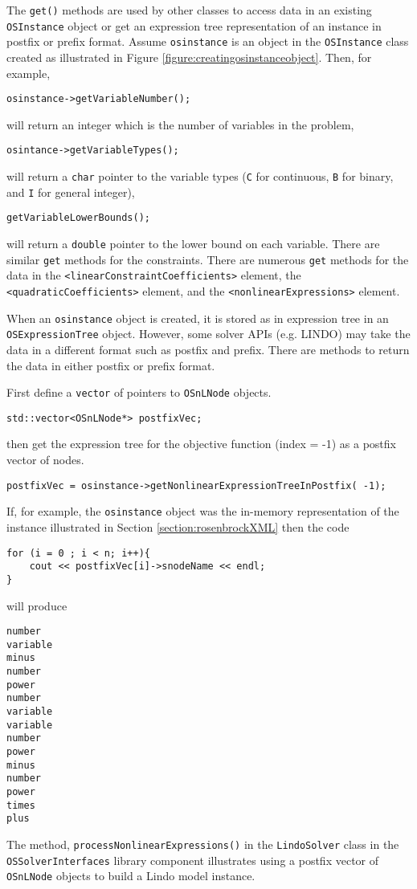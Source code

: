 \documentclass[11pt]{article}
\newcounter{Fig}
\renewcommand{\_}{{\char"5F}}
\renewcommand{\{}{{\char"7B}}
\renewcommand{\}}{{\char"7D}}
\renewcommand{\^}{{\char"0D}}
\renewcommand{\'}{{\char"0D}}
\begin{document}
The {\tt get()} methods are used by other classes to access data in an existing {\tt OSInstance} object or get an expression tree representation of an instance in postfix or prefix format.   Assume {\tt osinstance} is an object in the {\tt OSInstance} class created as illustrated in Figure \ref{figure:creatingosinstanceobject}. Then, for example,
\begin{verbatim}
osinstance->getVariableNumber();
\end{verbatim}
will return an integer which is the number of variables in the problem,
\begin{verbatim}
osintance->getVariableTypes();
\end{verbatim}
will return a {\tt char} pointer to the variable types ({\tt C} for continuous, {\tt B} for binary, and {\tt I} for general integer),
\begin{verbatim}
getVariableLowerBounds();
\end{verbatim}
will  return a {\tt double} pointer to the lower bound on each variable. There are similar {\tt get} methods for the constraints. There are numerous {\tt get} methods for the data in the {\tt <linearConstraintCoefficients>}  element, the {\tt <quadraticCoefficients>} element, and the {\tt <nonlinearExpressions>} element.

When an {\tt osinstance} object is created, it is stored as in expression tree in an {\tt OSExpressionTree} object. However, some solver APIs (e.g. LINDO) may take the data in a different format such as postfix and prefix. There are methods to return the data in either postfix or prefix format.

First define a {\tt vector} of pointers to {\tt OSnLNode} objects.
\begin{verbatim}
std::vector<OSnLNode*> postfixVec;
\end{verbatim}
then get the expression tree for the objective function (index = -1) as a postfix vector of nodes.
\begin{verbatim}
postfixVec = osinstance->getNonlinearExpressionTreeInPostfix( -1);
\end{verbatim}
If, for example, the {\tt osinstance} object was the in-memory representation of   the instance illustrated in  Section \ref{section:rosenbrockXML} then the code
\begin{verbatim}
for (i = 0 ; i < n; i++){
	cout << postfixVec[i]->snodeName << endl;	
}
\end{verbatim}
will produce
\begin{verbatim}
number
variable
minus
number
power
number
variable
variable
number
power
minus
number
power
times
plus
\end{verbatim}
The method, {\tt processNonlinearExpressions()} in the {\tt LindoSolver} class in the {\tt OSSolverInterfaces} library component illustrates using a postfix vector of {\tt OSnLNode} objects to build a Lindo model instance.
\end{document}
